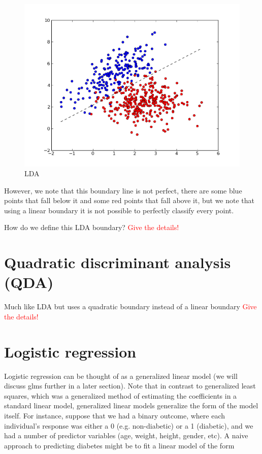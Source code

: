 \begin{figure}[H]
\begin{center}
\includegraphics[scale=0.8]{lda.png}
\end{center}
\caption{LDA}
\label{fig:lda}
\end{figure}

However, we note that this boundary line is not perfect, there are some blue points that fall below it and some red points that fall above it, but we note that using a linear boundary it is not possible to perfectly classify every point.

How do we define this LDA boundary? \textcolor{red}{Give the details!}


\section{Quadratic discriminant analysis (QDA)}

Much like LDA but uses a quadratic boundary instead of a linear boundary \textcolor{red}{Give the details!}


\section{Logistic regression}

Logistic regression can be thought of as a generalized linear model (we will discuss glms further in a later section). Note that in contrast to generalized least squares, which was a generalized method of estimating the coefficients in a standard linear model, generalized linear models generalize the form of the model itself. For instance, suppose that we had a binary outcome, where each individual's response was either a 0 (e.g. non-diabetic) or a 1 (diabetic), and we had a number of predictor variables (age, weight, height, gender, etc). A naive approach to predicting diabetes might be to fit a linear model of the form


